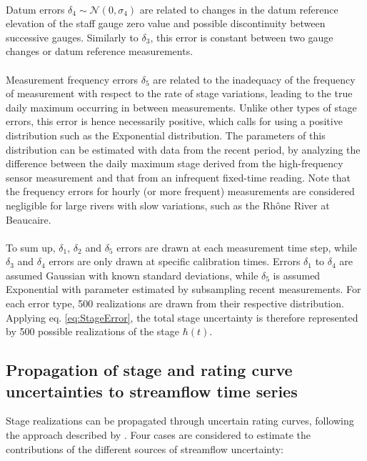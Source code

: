 \documentclass[11pt]{article}
\begin{document}
    \paragraph{}Datum errors $\delta_4  \sim \mathcal{N}(0,\sigma_4)$ are related to changes in the datum reference elevation of the staff gauge zero value and possible discontinuity between successive gauges. Similarly to $\delta_3$, this error is constant between two gauge changes or datum reference measurements. 
    
    \paragraph{}Measurement frequency errors $\delta_5$ are related to the inadequacy of the frequency of measurement with respect to the rate of stage variations, leading to the true daily maximum occurring in between measurements. Unlike other types of stage errors, this error is hence necessarily positive, which calls for using a positive distribution such as the Exponential distribution. The parameters of this distribution can be estimated with data from the recent period, by analyzing the difference between the daily maximum stage derived from the high-frequency sensor measurement and that from an infrequent fixed-time reading. Note that the frequency errors for hourly (or more frequent) measurements are considered negligible for large rivers with slow variations, such as the Rhône River at Beaucaire.
      
    \paragraph{}
    To sum up, $\delta_1$, $\delta_2$ and $\delta_5$ errors are drawn at each measurement time step, while $\delta_3$ and $\delta_4$ errors are only drawn at specific calibration times. Errors $\delta_1$ to $\delta_4$ are assumed Gaussian with known standard deviations, while $\delta_5$ is assumed Exponential with parameter estimated by subsampling recent measurements. For each error type, 500 realizations are drawn from their respective distribution. Applying eq. \ref{eq:StageError}, the total stage uncertainty is therefore represented by 500 possible realizations of the stage $\hbar(t)$.
   
   \subsection{Propagation of stage and rating curve uncertainties to streamflow time series}
   \label{subsec:PropagStage}
   Stage realizations can be propagated through uncertain rating curves, following the approach described by \citet{horner_impact_2018}. Four cases are considered to estimate the contributions of the different sources of streamflow uncertainty:
   
\end{document}
